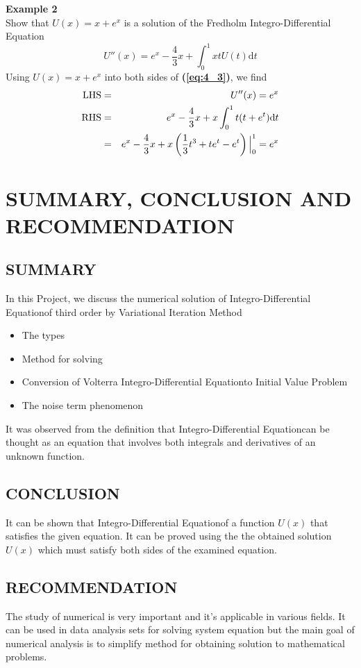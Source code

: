 \documentclass[12pt]{report}
\newcommand{\bt}[1]{\textbf{#1}}
\newcommand{\refn}[1]{\textbf{(\ref{#1})}}
\newcommand{\NI}{\noindent}
\newcommand{\IDE}{Integro-Differential Equation}
\begin{document}
	\NI \bt{Example 2}\\
	Show that $U(x) = x + e^x$ is a solution of the Fredholm \IDE
	\begin{equation}
		U''(x) = e^x - \frac{4}{3}x + \int_0^1 xtU(t)\text{d}t \label{eq:4_3}
	\end{equation}
	Using $U(x) = x + e^x$ into both sides of \refn{eq:4_3}, we find
	\begin{eqnarray}
		\text{LHS} &=& U''(x) = e^x \notag \\
		\text{RHS} &=& e^x - \frac{4}{3}x + x\int_0^1 t(t + e^t)\text{d}t \notag \\
		&=& e^x - \frac{4}{3}x + x\left(\frac{1}{3}t^3 + te^t - e^t\right)\Big|_0^1 = e^x \notag
	\end{eqnarray}
	
	
	\chapter{SUMMARY, CONCLUSION AND RECOMMENDATION}
	
	\section{SUMMARY}
	In this Project, we discuss the numerical solution of \IDE of third order by Variational Iteration Method
	\begin{itemize}
		\item The types 
		\item Method for solving
		\item Conversion of Volterra \IDE to Initial Value Problem
		\item The noise term phenomenon
	\end{itemize}

	\NI It was observed from the definition that \IDE can be thought as an equation that involves both integrals and derivatives of an unknown function.
	
	
	\section{CONCLUSION}
	It can be shown that \IDE of a function $U(x)$ that satisfies the given equation. It can be proved using the the obtained solution $U(x)$ which must satisfy both sides of the examined equation.
	
	
	\section{RECOMMENDATION}
	The study of numerical is very important and it's applicable in various fields. It can be used in data analysis sets for solving system equation but the main goal of numerical analysis is to simplify method for obtaining solution to mathematical problems.
	
\end{document}
